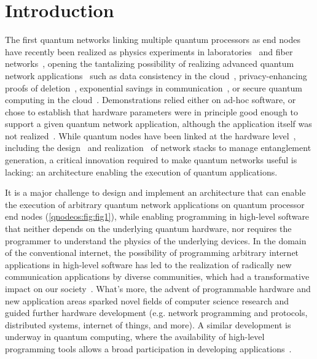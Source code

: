 \section{Introduction}

The first quantum networks linking multiple quantum processors as end nodes have recently been realized as physics experiments in laboratories~\cite{moehring_2007_ion_traps,ritter_2012_elementary,hofmann_2012_heralded,stockill_2017_phasetuned,stephenson_2020_highrate,pompili_2021_multinode,krutyanskiy_entanglement_2023} and fiber networks~\cite{liu2024creation,stolk2024metropolitan,knaut2024entanglement}, opening the tantalizing possibility of realizing advanced quantum network applications~\cite{wehner_2018_stages} such as data consistency in the cloud~\cite{benor_2005_byzantine}, privacy-enhancing proofs of deletion~\cite{poremba_quantum_2022}, exponential savings in communication~\cite{guerin_exponential_2016}, or secure quantum computing in the cloud~\cite{broadbent_2009_ubqc,childs_2005_secure_qc}.
Demonstrations relied either on ad-hoc software, or chose to establish that hardware parameters were in principle good enough to support a given quantum network application, although the application itself was not realized~\cite{nadlinger_device-independent_2022,liu_2022_photonic_diqkd,zhang_2022_diqkd}.
While quantum nodes have been linked at the hardware level~\cite{moehring_2007_ion_traps,ritter_2012_elementary,hofmann_2012_heralded,stockill_2017_phasetuned,jing2019entanglement,stephenson_2020_highrate,pompili_2021_multinode,krutyanskiy_entanglement_2023,van_leent_entangling_2022,stolk2024metropolitan,knaut2024entanglement}, including the design~\cite{dahlberg_2019_egp,kozlowski_2020_qnp,noauthor_aliro_nodate,pirker_2019_quantum} and realization~\cite{pompili_2022_experimental,monga_quant-net_2023} of network stacks to manage entanglement generation, a critical innovation required to make quantum networks useful is lacking: an architecture enabling the execution of quantum applications.

It is a major challenge to design and implement an architecture that can enable the execution of arbitrary quantum network applications on quantum processor end nodes (\cref{qnodeos:fig:fig1}), while enabling programming in high-level software that neither depends on the underlying quantum hardware, nor requires the programmer to understand the physics of the underlying devices.
In the domain of the conventional internet, the possibility of programming arbitrary internet applications in high-level software has led to the realization of radically new communication applications by diverse communities, which had a transformative impact on our society~\cite{castells_impact_2013}.
What's more, the advent of programmable hardware and new application areas sparked novel fields of computer science research and guided further hardware development (e.g. network programming and protocols, distributed systems, internet of things, and more).
A similar development is underway in quantum computing, where the availability of high-level programming tools allows a broad participation in developing applications~\cite{noauthor_quantum_2024}.

